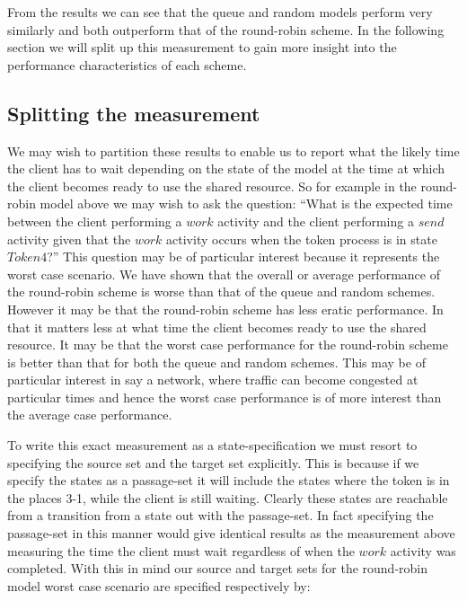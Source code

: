 \documentclass[times, 10pt,twocolumn]{article}
\newcommand{\quoteActivity}[1]{$#1$}
\newcommand{\quoteProcess}[1]{$#1$}
\begin{document}
From the results we can see that the queue and random models perform very
similarly and both outperform that of the round-robin scheme.
In the following section we will split up this measurement to gain
more insight into the performance characteristics of each scheme.


\subsection{Splitting the measurement}
\label{sub:section:splitting:measurement}

We may wish to partition these results to enable us to report
what the likely time the client has to wait depending on the
state of the model at the time at which the client becomes ready
to use the shared resource.
So for example in the round-robin model above we may wish to 
ask the question:
``What is the expected time between the client performing a
\quoteActivity{work} activity and the client performing a
\quoteActivity{send} activity given that the \quoteActivity{work}
activity occurs when the token process is in state
\quoteProcess{Token4}?''
This question may be of particular interest because it represents
the worst case scenario. We have shown that the overall or
average performance of the round-robin scheme is worse than that
of the queue and random schemes. However it may be that the
round-robin scheme has less eratic performance. In that it matters
less at what time the client becomes ready to use the shared resource.
It may be that the worst case performance for the round-robin scheme is
better than that for both the queue and random schemes.
This may be of particular interest in say a network, where traffic can
become congested at particular times and hence the worst case performance
is of more interest than the average case performance.

To write this exact measurement as a state-specification we must
resort to specifying the source set and the target set explicitly.
This is because if we specify the states as a passage-set it will
include the states where the token is in the places 3-1, while the
client is still waiting. Clearly these states are reachable from
a transition from a state out with the passage-set.
In fact specifying the passage-set in this manner would give identical
results as the measurement above measuring the time the client must
wait regardless of when the \quoteActivity{work} activity was completed.
With this in mind our source and target sets for the round-robin
model worst case scenario are specified respectively by:
\end{document}
